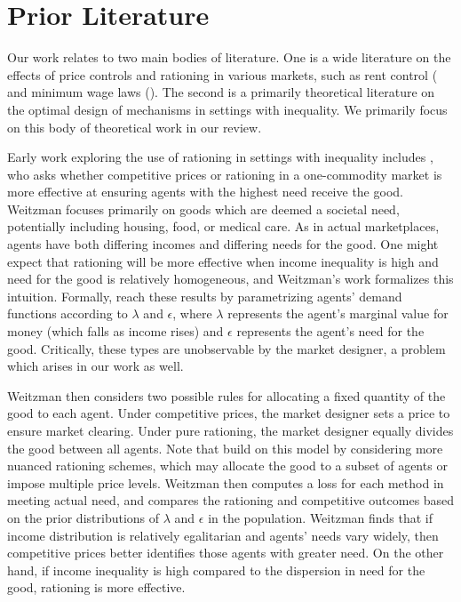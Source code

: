 \documentclass[AER]{AEA}
\begin{document}
\section{Prior Literature}
\label{sec:prior-literature}



Our work relates to two main bodies of literature. One is a wide literature on the effects of price controls and rationing in various markets, such as rent control (\cite{diamond-2019} and minimum wage laws (\cite{card-1993}). The second is a primarily theoretical literature on the optimal design of mechanisms in settings with inequality. We primarily focus on this body of theoretical work in our review.

Early work exploring the use of rationing in settings with inequality includes \cite{weitzman-1977}, who asks whether competitive prices or rationing in a one-commodity market is more effective at ensuring agents with the highest need receive the good. Weitzman focuses primarily on goods which are deemed a societal need, potentially including housing, food, or medical care. As in actual marketplaces, agents have both differing incomes and differing needs for the good. One might expect that rationing will be more effective when income inequality is high and need for the good is relatively homogeneous, and Weitzman's work formalizes this intuition. Formally, \cite{weitzman-1977} reach these results by parametrizing agents' demand functions according to $\lambda$ and $\epsilon$, where $\lambda$ represents the agent's marginal value for money (which falls as income rises) and $\epsilon$ represents the agent's need for the good. Critically, these types are unobservable by the market designer, a problem which arises in our work as well.

Weitzman then considers two possible rules for allocating a fixed quantity of the good to each agent. Under competitive prices, the market designer sets a price to ensure market clearing. Under pure rationing, the market designer equally divides the good between all agents. Note that \cite{dworczak-2020} build on this model by considering more nuanced rationing schemes, which may allocate the good to a subset of agents or impose multiple price levels. Weitzman then computes a loss for each method in meeting actual need, and compares the rationing and competitive outcomes based on the prior distributions of $\lambda$ and $\epsilon$ in the population. Weitzman finds that if income distribution is relatively egalitarian and agents' needs vary widely, then competitive prices better identifies those agents with greater need. On the other hand, if income inequality is high compared to the dispersion in need for the good, rationing is more effective.
\end{document}
